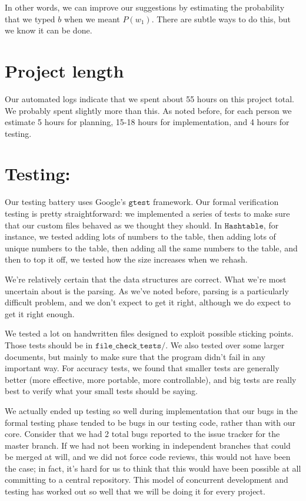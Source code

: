 \documentclass[a4paper]{article}
\begin{document}
In other words, we can improve our suggestions by estimating the probability that we typed $b$ when we meant $P(w_1)$. There are subtle ways to do this, but we know it can be done.

\section{Project length}

Our automated logs indicate that we spent about 55 hours on this project total. We probably spent slightly more than this. As noted before, for each person we estimate 5 hours for planning, 15-18 hours for implementation, and 4 hours for testing.

\section{Testing:}

Our testing battery uses Google's $\texttt{gtest}$ framework. Our formal verification testing is pretty straightforward: we implemented a series of tests to make sure that our custom files behaved as we thought they should. In $\texttt{Hashtable}$, for instance, we tested adding lots of numbers to the table, then adding lots of unique numbers to the table, then adding all the same numbers to the table, and then to top it off, we tested how the size increases when we rehash.

We're relatively certain that the data structures are correct. What we're most uncertain about is the parsing. As we've noted before, parsing is a particularly difficult problem, and we don't expect to get it right, although we do expect to get it right enough.

We tested a lot on handwritten files designed to exploit possible sticking points. Those tests should be in $\texttt{file\_check\_tests/}$. We also tested over some larger documents, but mainly to make sure that the program didn't fail in any important way. For accuracy tests, we found that smaller tests are generally better (more effective, more portable, more controllable), and big tests are really best to verify what your small tests should be saying.

We actually ended up testing so well during implementation that our bugs in the formal testing phase tended to be bugs in our testing code, rather than with our core. Consider that we had 2 total bugs reported to the issue tracker for the master branch. If we had not been working in independent branches that could be merged at will, and we did not force code reviews, this would not have been the case; in fact, it's hard for us to think that this would have been possible at all committing to a central repository. This model of concurrent development and testing has worked out so well that we will be doing it for every project.
\end{document}
